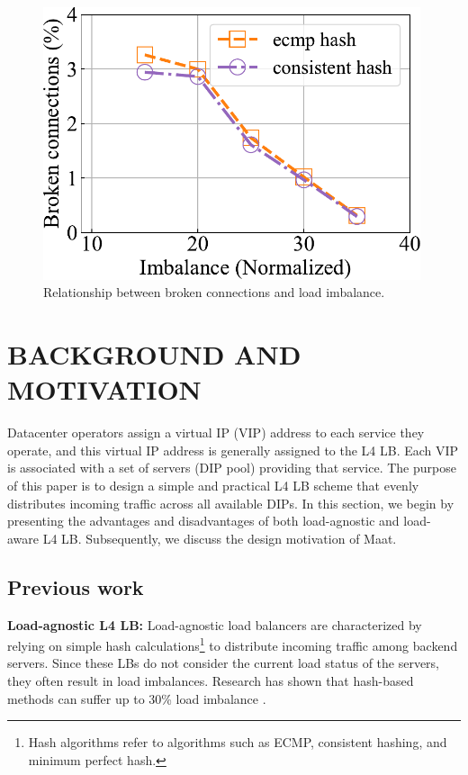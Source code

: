 \begin{figure}[htbp]
\begin{minipage}[t]{0.33\linewidth}
		\includegraphics[width=0.988\textwidth]{experiment/2brokenimbalance.pdf}
		\caption{Relationship between broken connections and load imbalance.}
		\label{3}
	\end{minipage}
\end{figure}

\section{BACKGROUND AND MOTIVATION}
Datacenter operators assign a virtual IP (VIP) address to each service they operate, and this virtual IP address is generally assigned to the L4 LB. Each VIP is associated with a set of servers (DIP pool) providing that service. The purpose of this paper is to design a simple and practical L4 LB scheme that evenly distributes incoming traffic across all available DIPs. In this section, we begin by presenting the advantages and disadvantages of both load-agnostic and load-aware L4 LB. Subsequently, we discuss the design motivation of Maat.
\subsection{Previous work}
\textbf{Load-agnostic L4 LB:}
Load-agnostic load balancers are characterized by relying on simple hash calculations\footnote{Hash algorithms refer to algorithms such as ECMP, consistent hashing, and minimum perfect hash.} to distribute incoming traffic among backend servers. Since these LBs do not consider the current load status of the servers, they often result in load imbalances. Research has shown that hash-based methods can suffer up to 30\% load imbalance \cite{eisenbud2016maglev}.

